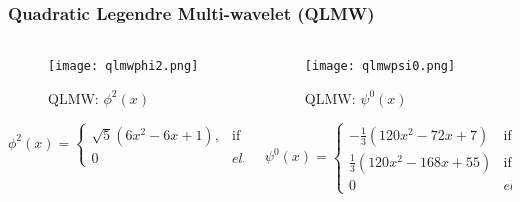\begin{frame}\frametitle{Quadratic Legendre Multi-wavelet (QLMW)}

    \begin{columns}[T]
      \begin{column}{.5\textwidth}
      
              \begin{figure}
              \centering
              \texttt{[image: qlmwphi2.png]}
              \caption{QLMW: $\phi^2(x)$}
              \label{fig_e_vs_n_f1}
              \end{figure}
              \vspace{-4 mm}

              \tiny{
                  \begin{equation}\label{eq:qlmwphi2}
                  \phi^2(x)=
                  \left\{
                      \begin{array}{ll}
                          \sqrt{5}(6x^2-6x+1),  & \mbox{if } 0 \leq x < 1 \\
                          0 & elsewhere
                      \end{array}
                  \right.
              \nonumber
              \end{equation}}


      \end{column}
      \begin{column}{.5\textwidth}
              \begin{figure}
              \centering
              \texttt{[image: qlmwpsi0.png]}
              \caption{QLMW: $\psi^0(x)$}
              \label{fig_e_vs_n_f2}
              \end{figure}
              \vspace{-4 mm}

              \tiny{
                         \begin{equation}
                            \psi^0(x)=
                            \left\{
                                \begin{array}{ll}
                                    -\frac{1}{3}(120x^2-72x+7)  & \mbox{if } 0 \leq x < \frac{1}{2} \\
                                    \frac{1}{3}(120x^2-168x+55)  & \mbox{if } \frac{1}{2} \leq x < 1 \\
                                    0 & elsewhere
                                \end{array}
                            \right.
                            \nonumber
                            \end{equation}}
        \end{column}
      \end{columns}
\end{frame}

